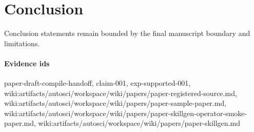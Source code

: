 \section{Conclusion}
Conclusion statements remain bounded by the final manuscript boundary and limitations.

\paragraph{Evidence ids} paper-draft-compile-handoff, claim-001, exp-supported-001, wiki:artifacts/autosci/workspace/wiki/papers/paper-registered-source.md, wiki:artifacts/autosci/workspace/wiki/papers/paper-sample-paper.md, wiki:artifacts/autosci/workspace/wiki/papers/paper-skillgen-operator-smoke-paper.md, wiki:artifacts/autosci/workspace/wiki/papers/paper-skillgen.md
